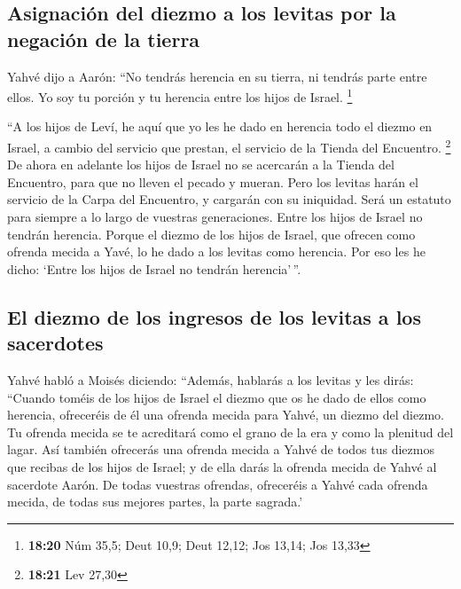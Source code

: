 \hypertarget{asignaciuxf3n-del-diezmo-a-los-levitas-por-la-negaciuxf3n-de-la-tierra}{%
\subsection{Asignación del diezmo a los levitas por la negación de la
tierra}\label{asignaciuxf3n-del-diezmo-a-los-levitas-por-la-negaciuxf3n-de-la-tierra}}

 Yahvé dijo a Aarón: ``No tendrás herencia en su tierra,
ni tendrás parte entre ellos. Yo soy tu porción y tu herencia entre los
hijos de Israel. \footnote{\textbf{18:20} Núm 35,5; Deut 10,9; Deut
  12,12; Jos 13,14; Jos 13,33}

 ``A los hijos de Leví, he aquí que yo les he dado en
herencia todo el diezmo en Israel, a cambio del servicio que prestan, el
servicio de la Tienda del Encuentro. \footnote{\textbf{18:21} Lev 27,30}
 De ahora en adelante los hijos de Israel no se acercarán
a la Tienda del Encuentro, para que no lleven el pecado y mueran.
 Pero los levitas harán el servicio de la Carpa del
Encuentro, y cargarán con su iniquidad. Será un estatuto para siempre a
lo largo de vuestras generaciones. Entre los hijos de Israel no tendrán
herencia.  Porque el diezmo de los hijos de Israel, que
ofrecen como ofrenda mecida a Yavé, lo he dado a los levitas como
herencia. Por eso les he dicho: `Entre los hijos de Israel no tendrán
herencia'\,''.

\hypertarget{el-diezmo-de-los-ingresos-de-los-levitas-a-los-sacerdotes}{%
\subsection{El diezmo de los ingresos de los levitas a los
sacerdotes}\label{el-diezmo-de-los-ingresos-de-los-levitas-a-los-sacerdotes}}

 Yahvé habló a Moisés diciendo:  ``Además,
hablarás a los levitas y les dirás: ``Cuando toméis de los hijos de
Israel el diezmo que os he dado de ellos como herencia, ofreceréis de él
una ofrenda mecida para Yahvé, un diezmo del diezmo.  Tu
ofrenda mecida se te acreditará como el grano de la era y como la
plenitud del lagar.  Así también ofrecerás una ofrenda
mecida a Yahvé de todos tus diezmos que recibas de los hijos de Israel;
y de ella darás la ofrenda mecida de Yahvé al sacerdote Aarón.
 De todas vuestras ofrendas, ofreceréis a Yahvé cada
ofrenda mecida, de todas sus mejores partes, la parte sagrada.'

